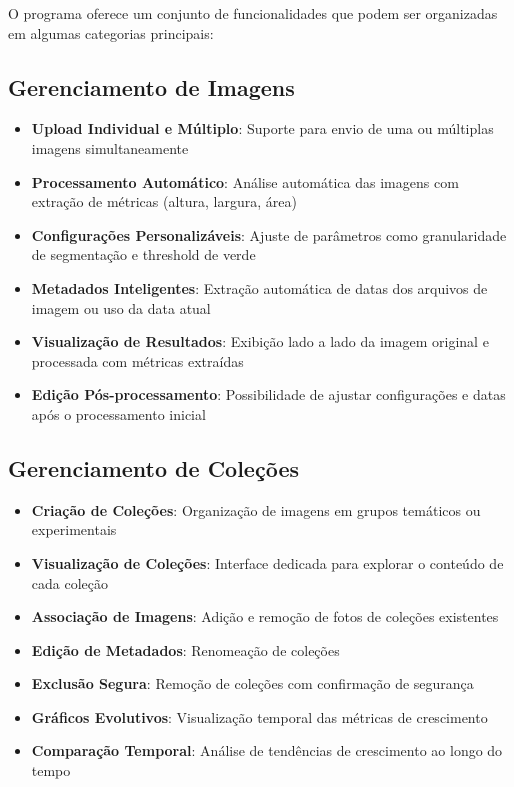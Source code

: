O programa oferece um conjunto de funcionalidades que podem ser organizadas em algumas categorias principais:

\subsection{Gerenciamento de Imagens}

\begin{itemize}
    \item \textbf{Upload Individual e Múltiplo}: Suporte para envio de uma ou múltiplas imagens simultaneamente
    \item \textbf{Processamento Automático}: Análise automática das imagens com extração de métricas (altura, largura, área)
    \item \textbf{Configurações Personalizáveis}: Ajuste de parâmetros como granularidade de segmentação e threshold de verde
    \item \textbf{Metadados Inteligentes}: Extração automática de datas dos arquivos de imagem ou uso da data atual
    \item \textbf{Visualização de Resultados}: Exibição lado a lado da imagem original e processada com métricas extraídas
    \item \textbf{Edição Pós-processamento}: Possibilidade de ajustar configurações e datas após o processamento inicial
\end{itemize}

\subsection{Gerenciamento de Coleções}

\begin{itemize}
    \item \textbf{Criação de Coleções}: Organização de imagens em grupos temáticos ou experimentais
    \item \textbf{Visualização de Coleções}: Interface dedicada para explorar o conteúdo de cada coleção
    \item \textbf{Associação de Imagens}: Adição e remoção de fotos de coleções existentes
    \item \textbf{Edição de Metadados}: Renomeação de coleções
    \item \textbf{Exclusão Segura}: Remoção de coleções com confirmação de segurança
    \item \textbf{Gráficos Evolutivos}: Visualização temporal das métricas de crescimento
    \item \textbf{Comparação Temporal}: Análise de tendências de crescimento ao longo do tempo
\end{itemize}

